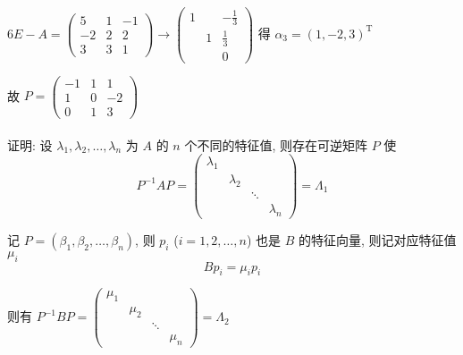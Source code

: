 \begin{enumerate}
                   \( 6E-A = \begin{pmatrix}
                       5  & 1 & -1 \\
                       -2 & 2 & 2  \\
                       3  & 3 & 1
                   \end{pmatrix} \rightarrow \begin{pmatrix}
                       1 &   & -\frac{1}{3} \\
                         & 1 & \frac{1}{3}  \\
                         &   & 0
                   \end{pmatrix} \) 得 \( \alpha_{3} = (1,-2,3)^{\mathrm{T}} \)

                   故 \( P = \begin{pmatrix}
                       -1 & 1 & 1  \\
                       1  & 0 & -2 \\
                       0  & 1 & 3
                   \end{pmatrix} \)
         \end{enumerate}


     \paragraph{} %
         证明: 设 \( \lambda_{1}, \lambda_{2}, \dots, \lambda_{n} \) 为 \( A \) 的 \( n \) 个不同的特征值, 则存在可逆矩阵 \( P \) 使
         \[ P^{-1}AP = \begin{pmatrix}
                 \lambda_{1} &             &                      \\
                             & \lambda_{2} &                      \\
                             &             & \ddots &             \\
                             &             &        & \lambda_{n}
             \end{pmatrix} = \Lambda_{1} \]

         记 \( P = (\beta_{1}, \beta_{2}, \dots, \beta_{n}) \), 则 \( p_{i} \) (\( i=1,2,\dots,n \)) 也是 \( B \) 的特征向量, 则记对应特征值 \( \mu_{i} \)
         \[ Bp_{i} = \mu_{i}p_{i} \]

         则有 \( P^{-1}BP = \begin{pmatrix}
             \mu_{1} &         &                  \\
                     & \mu_{2} &                  \\
                     &         & \ddots &         \\
                     &         &        & \mu_{n}
         \end{pmatrix} = \Lambda_{2} \)

